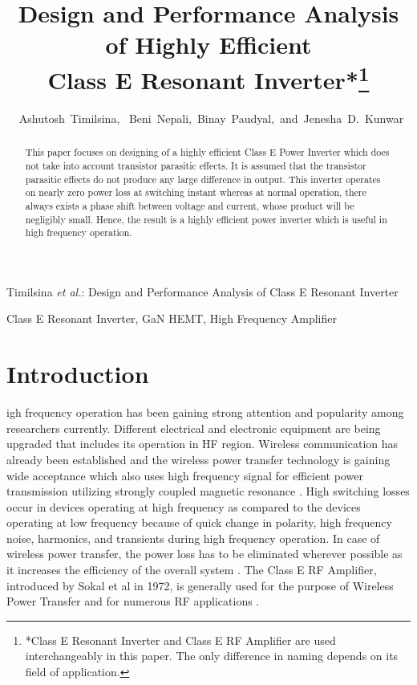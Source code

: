 \documentclass[journal,twoside]{IEEEtran}
\begin{document}
    \setcounter{page}{14}
    \title{Design and Performance Analysis of Highly Efficient\\Class E Resonant Inverter*\thanks{*Class E Resonant Inverter and Class E RF Amplifier are used interchangeably in this paper. The only difference
in naming depends on its field of application.}}
    \author{{~Ashutosh~Timilsina,~    Beni~Nepali,~Binay~Paudyal,~and~Jenesha~D.~Kunwar}\\
    }


%
{Timilsina \MakeLowercase{\textit{et al.}}: Design and Performance Analysis of Class E Resonant Inverter}

    \maketitle
	\begin{abstract}
This paper focuses on designing of a highly efficient Class E Power Inverter which does not take into account transistor
parasitic effects. It is assumed that the transistor parasitic effects do not produce any large difference in output. This
inverter operates on nearly zero power loss at switching instant whereas at normal operation, there always exists a phase
shift between voltage and current, whose product will be negligibly small. Hence, the result is a highly efficient power
inverter which is useful in high frequency operation.
	\end{abstract}
	\begin{IEEEkeywords}
Class E Resonant Inverter, GaN HEMT, High Frequency Amplifier
	\end{IEEEkeywords}
	\section{Introduction}
igh frequency operation has been gaining strong attention
and popularity among researchers currently. Different
electrical and electronic equipment are being upgraded that
includes its operation in HF region. Wireless communication
has already been established and the wireless power transfer
technology is gaining wide acceptance which also uses high
frequency signal for efficient power transmission utilizing
strongly coupled magnetic resonance \cite{Kurs2007}. High switching
losses occur in devices operating at high frequency as
compared to the devices operating at low frequency because
of quick change in polarity, high frequency noise, harmonics,
and transients during high frequency operation. In case of
wireless power transfer, the power loss has to be eliminated
wherever possible as it increases the efficiency of the overall
system \cite{Fu2013}. The Class E RF Amplifier, introduced
by Sokal et al in 1972, is generally used for the purpose of
Wireless Power Transfer and for numerous RF applications
\cite{Klehn2009}.
\end{document}
